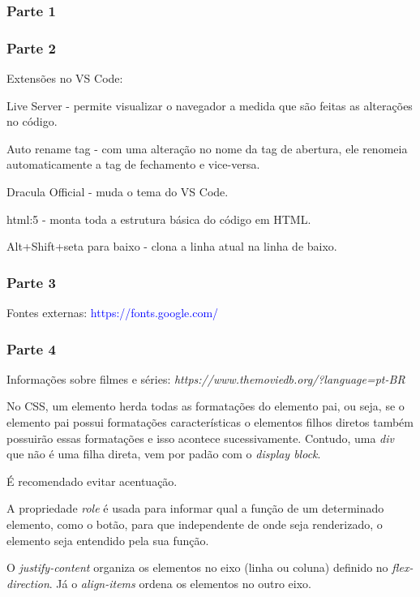 \documentclass[12pt,a4paper]{article}
\begin{document}
	\subsubsection{Parte 1}
	
	\subsubsection{Parte 2}
	
	Extensões no VS Code: 
	
	Live Server  - permite visualizar o navegador a medida que são feitas as alterações no código.
	
	Auto rename tag - com uma alteração no nome da tag de abertura, ele renomeia automaticamente a tag de fechamento e vice-versa.
	
	Dracula Official - muda o tema do VS Code.
	
	html:5 - monta toda a estrutura básica do código em HTML.
	
	Alt+Shift+seta para baixo - clona a linha atual na linha de baixo.
	
	\subsubsection{Parte 3}
	
	Fontes externas: \textcolor{blue}{https://fonts.google.com/}
	
	\subsubsection{Parte 4}
	
	Informações sobre filmes e séries: \textit{https://www.themoviedb.org/?language=pt-BR}
	
	No CSS,  um elemento herda todas as formatações do elemento pai, ou seja, se o elemento pai possui formatações características o elementos filhos diretos também possuirão essas formatações e isso acontece sucessivamente. Contudo, uma \textit{div} que não é uma filha direta, vem por padão com o \textit{display block}. 
	
	É recomendado evitar acentuação.
	
	A propriedade \textit{role} é usada para informar qual a função de um determinado elemento, como o botão, para que independente de onde seja renderizado, o elemento seja entendido pela sua função.
	
	O \textit{justify-content} organiza os elementos no eixo (linha ou coluna) definido no \textit{flex-direction}. Já o \textit{align-items} ordena os elementos no outro eixo.
	
\end{document}
